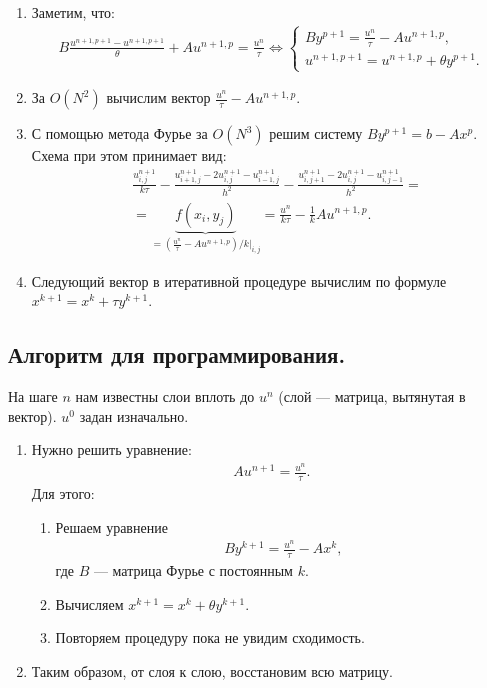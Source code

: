 \documentclass[14pt,a4paper]{extarticle}
\newcommand{\1}{\mathbbm{1}}
\begin{document}
\begin{enumerate}
    \item Заметим, что:
    \begin{align*}
        B \frac{u^{n+1, p+1} - u^{n+1, p+1}}{\theta} + A u^{n+1, p} 
        = \frac{u^{n}}{\tau}\Leftrightarrow 
        \left\{\begin{array}{l}
            B y^{p+1} = \frac{u^{n}}{\tau} - A u^{n+1, p}, \\
            u^{n+1, p+1} = u^{n+1, p} + \theta y^{p+1}.
        \end{array}\right.
    \end{align*}
    \item За $O(N^2)$ вычислим вектор $\frac{u^{n}}{\tau} - A u^{n+1, p}$.
    \item С помощью метода Фурье за $O(N^3)$ решим систему $B y^{p+1} = b - A x^p$. Схема при этом принимает вид:
\begin{align*}
    &\frac{u^{n+1}_{i,j}}{k \tau} - 
    \frac{u^{n+1}_{i+1, j} - 2 u^{n+1}_{i, j}- u^{n+1}_{i-1, j}}{h^2} -  
    \frac{u^{n+1}_{i, j+1} - 2 u^{n+1}_{i, j}- u^{n+1}_{i, j-1}}{h^2} =\\&= 
    \underbrace{f(x_i, y_j)}_{= (\frac{u^{n}}{\tau} - A u^{n+1, p})/k\big|_{i,j}} = \frac{u^{n}}{k\tau} - \frac{1}{k} A u^{n+1, p}.
\end{align*}

    \item Следующий вектор в итеративной процедуре вычислим по формуле $x^{k+1} = x^k + \tau y^{k+1}$.
\end{enumerate}
\subsection{Алгоритм для программирования.}
На шаге $n$ нам известны слои вплоть до $u^n$ (слой --- матрица, вытянутая в вектор). $u^0$ задан изначально. 
\begin{enumerate} 
    \item Нужно решить уравнение:
    \begin{align*}
        A u^{n+1} = \frac{u^n}{\tau}.
    \end{align*}
    Для этого:
    \begin{enumerate}
        \item Решаем уравнение 
        \begin{align*}
            B y^{k+1} = \frac{u^{n}}{\tau} - A x^k,
        \end{align*}
        где $B$ --- матрица Фурье с постоянным $k$.
        \item Вычисляем $x^{k+1}=x^k + \theta y^{k+1}$.
        \item Повторяем процедуру пока не увидим сходимость.
    \end{enumerate}
    \item Таким образом, от слоя к слою, восстановим всю матрицу.
\end{enumerate}
\end{document}

